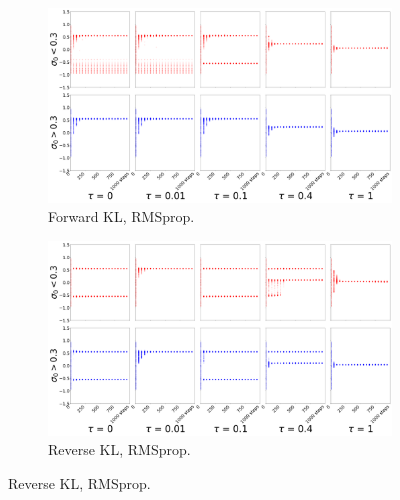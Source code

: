 \documentclass{article}
\begin{document}
\begin{figure}[!ht]
  \begin{subfigure}[b]{0.4\linewidth}
    \centering
    \includegraphics[width=1\columnwidth]{figs/bandit/notlearnQ/modes=1/rmsprop/mean_forward_optim=rmsprop_modes=1_lr=0.01.png}
    \caption{Forward KL, RMSprop.}
    \label{fig:bandit-mean-forward-rmsprop}
  \end{subfigure}%
  \begin{subfigure}[b]{0.4\linewidth}
    \centering
    \includegraphics[width=1\columnwidth]{figs/bandit/notlearnQ/modes=1/rmsprop/mean_reverse_optim=rmsprop_modes=1_lr=0.01.png}
    \caption{Reverse KL, RMSprop.}
    \label{fig:bandit-mean-reverse-rmsprop}
  \end{subfigure}
  

\end{figure}
\end{document}
